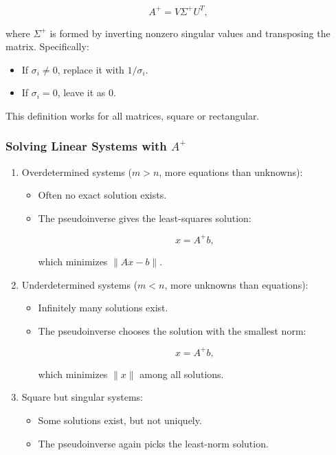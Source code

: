 \documentclass[
  letterpaper,
  DIV=11,
  numbers=noendperiod]{scrreprt}
\providecommand{\tightlist}{%
  \setlength{\itemsep}{0pt}\setlength{\parskip}{0pt}}
\begin{document}
\[
A^+ = V \Sigma^+ U^T,
\]

where \(\Sigma^+\) is formed by inverting nonzero singular values and
transposing the matrix. Specifically:

\begin{itemize}
\tightlist
\item
  If \(\sigma_i \neq 0\), replace it with \(1/\sigma_i\).
\item
  If \(\sigma_i = 0\), leave it as 0.
\end{itemize}

This definition works for all matrices, square or rectangular.

\subsubsection{\texorpdfstring{Solving Linear Systems with
\(A^+\)}{Solving Linear Systems with A\^{}+}}\label{solving-linear-systems-with-a}

\begin{enumerate}
\def\labelenumi{\arabic{enumi}.}
\item
  Overdetermined systems (\(m > n\), more equations than unknowns):

  \begin{itemize}
  \item
    Often no exact solution exists.
  \item
    The pseudoinverse gives the least-squares solution:

    \[
    x = A^+ b,
    \]

    which minimizes \(\|Ax - b\|\).
  \end{itemize}
\item
  Underdetermined systems (\(m < n\), more unknowns than equations):

  \begin{itemize}
  \item
    Infinitely many solutions exist.
  \item
    The pseudoinverse chooses the solution with the smallest norm:

    \[
    x = A^+ b,
    \]

    which minimizes \(\|x\|\) among all solutions.
  \end{itemize}
\item
  Square but singular systems:

  \begin{itemize}
  \tightlist
  \item
    Some solutions exist, but not uniquely.
  \item
    The pseudoinverse again picks the least-norm solution.
  \end{itemize}
\end{enumerate}
\end{document}
